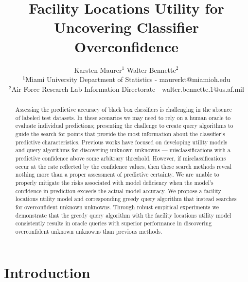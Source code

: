 \documentclass[letterpaper]{article} %
\begin{document}
%
\title{Facility Locations Utility for Uncovering Classifier Overconfidence}
\author{Karsten Maurer$^1$ \hspace{.2in} Walter Bennette$^2$\\
$^1$Miami University Department of Statistics - maurerkt@miamioh.edu\\ 
$^2$Air Force Research Lab Information Directorate - walter.bennette.1@us.af.mil \\
}

\maketitle
\begin{abstract}
Assessing the predictive accuracy of black box classifiers is challenging in the absence of labeled test datasets. In these scenarios we may need to rely on a human oracle to evaluate individual predictions; presenting the challenge to create query algorithms to guide the search for points that provide the most information about the classifier's predictive characteristics. Previous works have focused on developing utility models and query algorithms for discovering unknown unknowns --- misclassifications with a predictive confidence above some arbitrary threshold. However, if misclassifications occur at the rate reflected by the confidence values, then these search methods reveal nothing more than a proper assessment of predictive certainty. We are unable to properly mitigate the risks associated with model deficiency when the model's confidence in prediction exceeds the actual model accuracy. We propose a facility locations utility model and corresponding greedy query algorithm that instead searches for overconfident unknown unknowns. Through robust empirical experiments we demonstrate that the greedy query algorithm with the facility locations utility model consistently results in oracle queries with superior performance in discovering overconfident unknown unknowns than previous methods. 
\end{abstract}

\section{Introduction}
\end{document}
